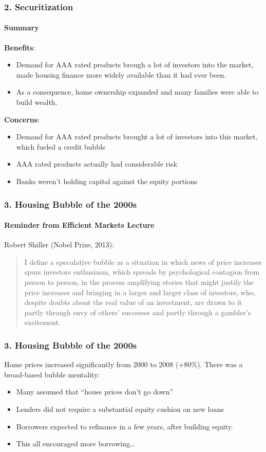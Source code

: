 \documentclass{beamer}
\begin{document}
\begin{frame}[t]
    \frametitle{2. Securitization}
    \framesubtitle{Summary}

\textbf{Benefits}:  
\begin{itemize}
    \item Demand for AAA rated products brough a lot of investors into the market, made housing finance more widely available than it had ever been.
    \item As a consequence, home ownership expanded and many families were able to build wealth.
\end{itemize}
\vspace{1em}

\textbf{Concerns}:
\begin{itemize}
    \item Demand for AAA rated products brought a lot of investors into this market, which fueled a credit bubble
    \item AAA rated products actually had considerable risk
    \item Banks weren’t holding capital against the equity portions
\end{itemize}
\end{frame}

\begin{frame}[t]
    \frametitle{3. Housing Bubble of the 2000s}
    \framesubtitle{Reminder from Efficient Markets Lecture}

    Robert Shiller (Nobel Prize, 2013): 
    \vspace{1em}
    
    \begin{quote} 
    I define a speculative bubble as a situation in which news of price increases spurs investors enthusiasm, which spreads by psychological contagion from person to person, in the process amplifying stories that might justify the price increases and bringing in a larger and larger class of investors, who, despite doubts about the real value of an investment, are drawn to it partly through envy of others' successes and partly through a gambler's excitement.
    \end{quote}
\end{frame}


\begin{frame}[t]
    \frametitle{3. Housing Bubble of the 2000s}

Home prices increased significantly from 2000 to 2008 (+80\%).
\vspace{1em}
There was a broad-based bubble mentality:
\begin{itemize}
    \item Many assumed that “house prices don’t go down”
    \item Lenders did not require a substantial equity cushion on new loans
    \item Borrowers expected to refinance in a few years, after building equity. 
    \item This all encouraged more borrowing…
\end{itemize}

\end{frame}
\end{document}

